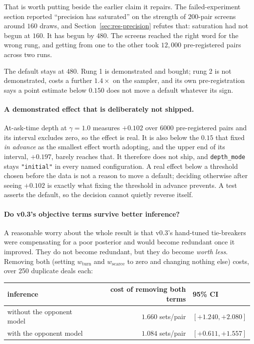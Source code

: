\documentclass[11pt,letterpaper]{article}
\begin{document}
That is worth putting beside the earlier claim it repairs. The failed-experiment
section reported ``precision has saturated'' on the strength of $200$-pair
screens around $160$ draws, and Section~\ref{sec:res-precision} refutes that:
saturation had not begun at $160$. It has begun by $480$. The screens reached
the right word for the wrong rung, and getting from one to the other took
$12{,}000$ pre-registered pairs across two runs.

The default stays at $480$. Rung 1 is demonstrated and bought; rung 2 is not
demonstrated, costs a further $1.4\times$ on the sampler, and its own
pre-registration says a point estimate below $0.150$ does not move a default
whatever its sign.

\paragraph{A demonstrated effect that is deliberately not shipped.} At-ask-time
depth at $\gamma = 1.0$ measures $+0.102$ over $6000$ pre-registered pairs and
its interval excludes zero, so the effect is real. It is also below the $0.15$
that  fixed \emph{in advance} as the
smallest effect worth adopting, and the upper end of its interval, $+0.197$,
barely reaches that. It therefore does not ship, and \texttt{depth\_mode} stays
\texttt{"initial"} in every named configuration. A real effect below a threshold
chosen before the data is not a reason to move a default; deciding otherwise
after seeing $+0.102$ is exactly what fixing the threshold in advance prevents.
A test asserts the default, so the decision cannot quietly reverse itself.

\paragraph{Do v0.3's objective terms survive better inference?} A reasonable
worry about the whole result is that v0.3's hand-tuned tie-breakers were
compensating for a poor posterior and would become redundant once it improved.
They do not become redundant, but they do become \emph{worth less}. Removing
both (setting $w_{\mathrm{turn}}$ and $w_{\mathrm{scarce}}$ to zero and
changing nothing else) costs, over 250 duplicate deals each:

\begin{center}
\small
\begin{tabular}{lrl}
\toprule
inference & cost of removing both terms & 95\% CI \\
\midrule
without the opponent model & $1.660$ sets/pair & $[+1.240, +2.080]$ \\
with the opponent model    & $1.084$ sets/pair & $[+0.611, +1.557]$ \\
\bottomrule
\end{tabular}
\end{center}
\end{document}
